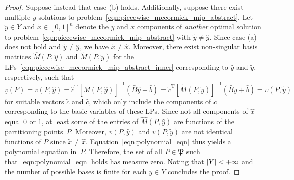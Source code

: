 \documentclass{article}
\newcommand{\tr}[1]{\ensuremath{{#1}^\text{T}}}
\DeclarePairedDelimiter\abs{\lvert}{\rvert}%
\begin{document}
\begin{proof}
Suppose instead that case (b) holds.
Additionally, suppose there exist multiple $y$ solutions to problem~\eqref{eqn:piecewise_mccormick_mip_abstract}.
Let $\tilde{y} \in Y$ and $\tilde{x} \in [0,1]^n$ denote the $y$ and $x$ components of \textit{another} optimal solution to problem~\eqref{eqn:piecewise_mccormick_mip_abstract} with $\tilde{y} \neq \hat{y}$.
Since case (a) does not hold and $\tilde{y} \neq \hat{y}$, we have $\tilde{x} \neq \hat{x}$.
Moreover, there exist non-singular basis matrices $\hat{M}(P,\hat{y})$ and $\tilde{M}(P,\tilde{y})$ for the LPs~\eqref{eqn:piecewise_mccormick_mip_abstract_inner} corresponding to $\hat{y}$ and $\tilde{y}$, respectively, such that 
\begin{equation}
\label{eqn:polynomial_eqn}
\underline{v}(P) = v(P,\hat{y}) = \tr{\hat{c}} [\hat{M}(P,\hat{y})]^{-1} (\bar{B} \hat{y} + \bar{b}) = \tr{\tilde{c}} [\tilde{M}(P,\tilde{y})]^{-1} (\bar{B} \tilde{y} + \bar{b}) = v(P,\tilde{y})
\end{equation}
for suitable vectors $\tilde{c}$ and $\hat{c}$, which only include the components of $\bar{c}$ corresponding to the basic variables of these LPs.
Since not all components of $\hat{x}$ equal $0$ or $1$, at least some of the entries of $\hat{M}(P,\hat{y})$ are functions of the partitioning points~$P$.
Moreover, $v(P,\hat{y})$ and $v(P,\tilde{y})$ are not identical functions of $P$ since $\tilde{x} \neq \hat{x}$.
Equation~\eqref{eqn:polynomial_eqn} thus yields a polynomial equation in~$P$.
Therefore, the set of all $P \in \mathfrak{P}$ such that~\eqref{eqn:polynomial_eqn} holds has measure zero.
Noting that $\abs{Y} < +\infty$ and the number of possible bases is finite for each $y \in Y$ concludes the proof.
\end{proof}
\end{document}
